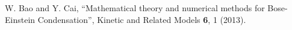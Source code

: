 \documentclass[twocolumn,showpacs,showkeys,preprintnumbers,superscriptaddress, pra, 10pt, aps]{revtex4-2}
\begin{document}
\begin{thebibliography}{55}
  W. Bao and Y. Cai, ``Mathematical theory and numerical methods for Bose-Einstein Condensation”, Kinetic and Related Models \textbf{6}, 1 (2013).








\end{thebibliography}
\end{document}
